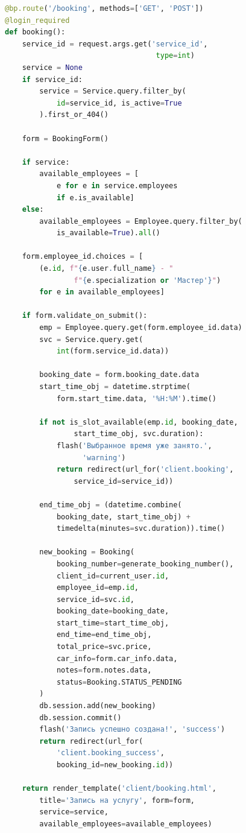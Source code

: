 \documentclass[14pt,a4paper,oneside]{extarticle}
\begin{document}
\begin{lstlisting}[language=Python, caption={Обработка формы записи (client/routes.py)}, label={lst:booking_handler}]
@bp.route('/booking', methods=['GET', 'POST'])
@login_required
def booking():
    service_id = request.args.get('service_id',
                                   type=int)
    service = None
    if service_id:
        service = Service.query.filter_by(
            id=service_id, is_active=True
        ).first_or_404()

    form = BookingForm()

    if service:
        available_employees = [
            e for e in service.employees
            if e.is_available]
    else:
        available_employees = Employee.query.filter_by(
            is_available=True).all()

    form.employee_id.choices = [
        (e.id, f"{e.user.full_name} - "
                f"{e.specialization or 'Мастер'}")
        for e in available_employees]

    if form.validate_on_submit():
        emp = Employee.query.get(form.employee_id.data)
        svc = Service.query.get(
            int(form.service_id.data))

        booking_date = form.booking_date.data
        start_time_obj = datetime.strptime(
            form.start_time.data, '%H:%M').time()

        if not is_slot_available(emp.id, booking_date,
                start_time_obj, svc.duration):
            flash('Выбранное время уже занято.',
                  'warning')
            return redirect(url_for('client.booking',
                service_id=service_id))

        end_time_obj = (datetime.combine(
            booking_date, start_time_obj) +
            timedelta(minutes=svc.duration)).time()

        new_booking = Booking(
            booking_number=generate_booking_number(),
            client_id=current_user.id,
            employee_id=emp.id,
            service_id=svc.id,
            booking_date=booking_date,
            start_time=start_time_obj,
            end_time=end_time_obj,
            total_price=svc.price,
            car_info=form.car_info.data,
            notes=form.notes.data,
            status=Booking.STATUS_PENDING
        )
        db.session.add(new_booking)
        db.session.commit()
        flash('Запись успешно создана!', 'success')
        return redirect(url_for(
            'client.booking_success',
            booking_id=new_booking.id))

    return render_template('client/booking.html',
        title='Запись на услугу', form=form,
        service=service,
        available_employees=available_employees)
\end{lstlisting}
\end{document}
